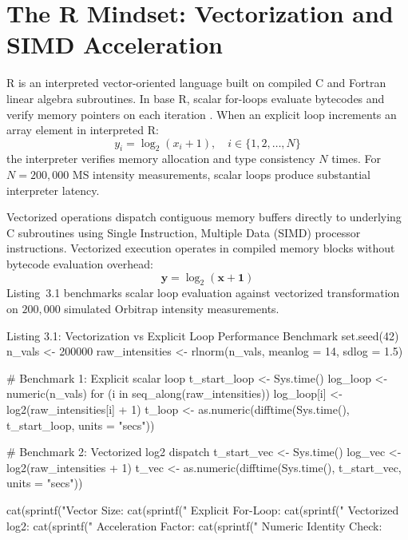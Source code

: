 \documentclass[11pt,twoside,openright]{book}
\begin{document}
\FloatBarrier
\section{The R Mindset: Vectorization and SIMD Acceleration}
\label{sec:vectorization}

R is an interpreted vector-oriented language built on compiled C and Fortran linear algebra subroutines. In base R, scalar for-loops evaluate bytecodes and verify memory pointers on each iteration \cite{chambers2008software, wickham2019welcome}. When an explicit loop increments an array element in interpreted R:
\begin{equation}
y_i = \log_2(x_i + 1), \quad i \in \{1, 2, \dots, N\}
\label{eq:scalar_loop}
\end{equation}
the interpreter verifies memory allocation and type consistency $N$ times. For $N = 200{,}000$ MS intensity measurements, scalar loops produce substantial interpreter latency.

Vectorized operations dispatch contiguous memory buffers directly to underlying C subroutines using Single Instruction, Multiple Data (SIMD) processor instructions. Vectorized execution operates in compiled memory blocks without bytecode evaluation overhead:
\begin{equation}
\mathbf{y} = \log_2(\mathbf{x} + \mathbf{1})
\label{eq:vector_dispatch}
\end{equation}
Listing~3.1 benchmarks scalar loop evaluation against vectorized transformation on $200{,}000$ simulated Orbitrap intensity measurements.

\begin{rchunk}{Listing 3.1: Vectorization vs Explicit Loop Performance Benchmark}
set.seed(42)
n_vals <- 200000
raw_intensities <- rlnorm(n_vals, meanlog = 14, sdlog = 1.5)

# Benchmark 1: Explicit scalar loop
t_start_loop <- Sys.time()
log_loop <- numeric(n_vals)
for (i in seq_along(raw_intensities)) {
  log_loop[i] <- log2(raw_intensities[i] + 1)
}
t_loop <- as.numeric(difftime(Sys.time(), t_start_loop, units = "secs"))

# Benchmark 2: Vectorized log2 dispatch
t_start_vec <- Sys.time()
log_vec <- log2(raw_intensities + 1)
t_vec <- as.numeric(difftime(Sys.time(), t_start_vec, units = "secs"))

cat(sprintf("Vector Size: %
cat(sprintf("  Explicit For-Loop: %
cat(sprintf("  Vectorized log2:   %
cat(sprintf("  Acceleration Factor: %
cat(sprintf("  Numeric Identity Check: %
\end{rchunk}
\end{document}
